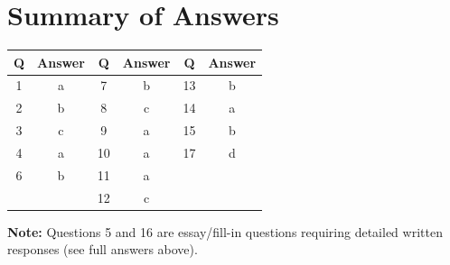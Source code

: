 \documentclass[11pt]{article}
\begin{document}
\section*{Summary of Answers}

\begin{center}
\begin{tabular}{|c|c|c|c|c|c|}
\hline
\textbf{Q} & \textbf{Answer} & \textbf{Q} & \textbf{Answer} & \textbf{Q} & \textbf{Answer} \\
\hline
1 & a & 7 & b & 13 & b \\
2 & b & 8 & c & 14 & a \\
3 & c & 9 & a & 15 & b \\
4 & a & 10 & a & 17 & d \\
6 & b & 11 & a & & \\
 & & 12 & c & & \\
\hline
\end{tabular}
\end{center}

\textbf{Note:} Questions 5 and 16 are essay/fill-in questions requiring detailed written responses (see full answers above).
\end{document}
